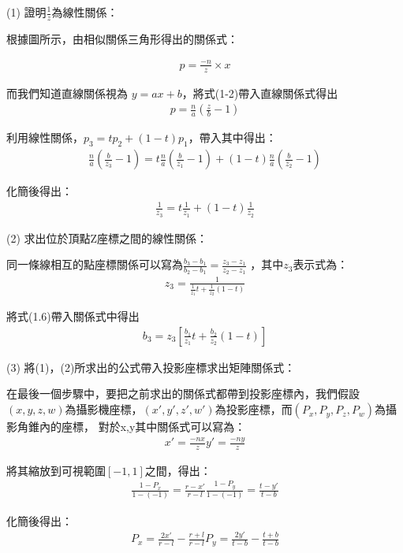 	(1) 證明$\frac{1}{z}$為線性關係：
	
	根據圖所示，由相似關係三角形得出的關係式：
	
	\begin{align}
		p = \frac{-n}{z} \times x		 		
	\end{align}
	
	而我們知道直線關係視為 $y = ax + b$，將式(1-2)帶入直線關係式得出	
	\begin{align}
		p = \frac{n}{a} (\frac{z}{b} - 1)
	\end{align}
	
	利用線性關係，$p_3 = tp_2 +(1-t)p_1$，帶入其中得出：	
	\begin{align}
		\frac{n}{a} (\frac{b}{z_3} - 1) = t \frac{n}{a} ( \frac{b}{z_1} - 1) + (1-t)\frac{n}{a} (\frac{b}{z_2} - 1)
	\end{align}
	
	化簡後得出：
	\begin{align}
		\frac{1}{z_3} = t \frac{1}{z_1}  + (1-t)\frac{1}{z_2} 
	\end{align}
	
	(2) 求出位於頂點Z座標之間的線性關係：
	
	同一條線相互的點座標關係可以寫為$\frac{b_3 - b_1}{b_2 - b_1} = \frac{z_3 - z_1}{z_2 - z_1} $ ，其中$z_3$表示式為：
	\begin{align}
		z_3 = \frac{1}{\frac{1}{z_1}t + \frac{1}{z_2} (1-t)}
	\end{align}
	
	將式(1.6)帶入關係式中得出
	\begin{align}
		b_3 = z_3[ \frac{b_1}{z_1}t + \frac{b_2}{z_2}(1-t) ]
	\end{align}
	
	(3) 將(1)，(2)所求出的公式帶入投影座標求出矩陣關係式：
	
	在最後一個步驟中，要把之前求出的關係式都帶到投影座標內，我們假設$(x, y, z, w)$為攝影機座標，$(x', y', z', w')$為投影座標，而$(P_x, P_y,P_z,P_w)$為攝影角錐內的座標，
	對於x,y其中關係式可以寫為：	
	\begin{align}
		x' = \frac{-nx}{z}  	y' = \frac{-ny}{z}
	\end{align}
	
	將其縮放到可視範圍$[-1,1]$之間，得出：	
	\begin{align}
		\frac{1-P_x}{1-(-1)} = \frac{r-x'}{r-l}  		\frac{1-P_y}{1-(-1)} = \frac{t-y'}{t-b}
	\end{align}
	
	化簡後得出：
	\begin{align}
		P_x = \frac{2x'}{r-l} - \frac{r+l}{r-l} 		P_y = \frac{2y'}{t-b} - \frac{t+b}{t-b}
	\end{align}
	
